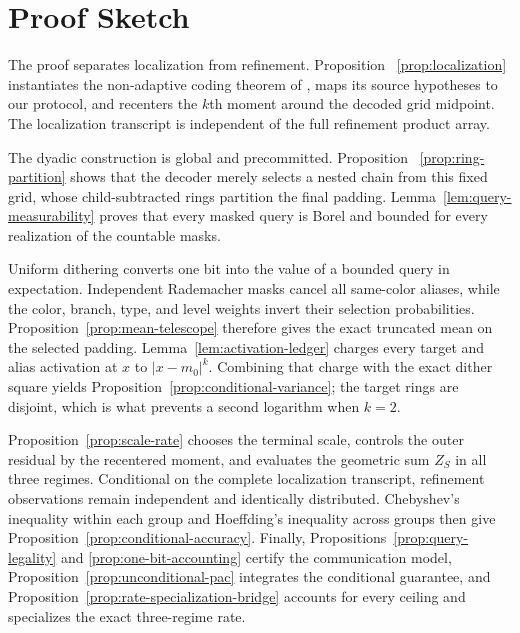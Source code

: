 \section{Proof Sketch}

The proof separates localization from refinement.  Proposition~
\ref{prop:localization} instantiates the non-adaptive coding theorem of
\citet{lau-scarlett-2026}, maps its source hypotheses to our protocol, and
recenters the $k$th moment around the decoded grid midpoint.  The localization
transcript is independent of the full refinement product array.

The dyadic construction is global and precommitted.  Proposition~
\ref{prop:ring-partition} shows that the decoder merely selects a nested chain
from this fixed grid, whose child-subtracted rings partition the final padding.
Lemma~\ref{lem:query-measurability} proves that every masked query is Borel and
bounded for every realization of the countable masks.

Uniform dithering converts one bit into the value of a bounded query in
expectation.  Independent Rademacher masks cancel all same-color aliases, while
the color, branch, type, and level weights invert their selection probabilities.
Proposition~\ref{prop:mean-telescope} therefore gives the exact truncated mean
on the selected padding.  Lemma~\ref{lem:activation-ledger} charges every
target and alias activation at $x$ to $|x-m_0|^k$.  Combining that charge with
the exact dither square yields Proposition~\ref{prop:conditional-variance};
the target rings are disjoint, which is what prevents a second logarithm when
$k=2$.

Proposition~\ref{prop:scale-rate} chooses the terminal scale, controls the
outer residual by the recentered moment, and evaluates the geometric sum
$Z_S$ in all three regimes.  Conditional on the complete localization
transcript, refinement observations remain independent and identically
distributed.  Chebyshev's inequality within each group and Hoeffding's
inequality across groups then give Proposition~\ref{prop:conditional-accuracy}.
Finally, Propositions~\ref{prop:query-legality} and
\ref{prop:one-bit-accounting} certify the communication model,
Proposition~\ref{prop:unconditional-pac} integrates the conditional guarantee,
and Proposition~\ref{prop:rate-specialization-bridge} accounts for every
ceiling and specializes the exact three-regime rate.
